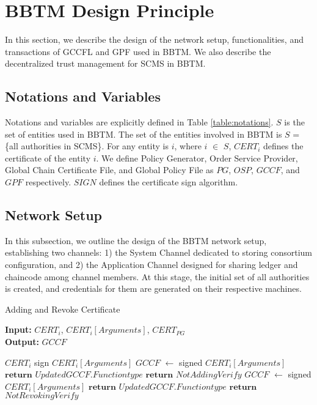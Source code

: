 \section{BBTM Design Principle }
\label{sec:bbtmdesign}
In this section, we describe the design of the network setup, functionalities, and transactions of GCCFL and GPF used in BBTM. We also describe the decentralized trust management for SCMS in BBTM.  

\subsection{Notations and Variables}
Notations and variables are explicitly defined in Table \ref{table:notations}. $S$ is the set of entities used in BBTM. The set of the entities involved in BBTM is $S$ =\{all authorities in SCMS\}. For any entity is $i$, where $i$ $\in$ $S$, $CERT_{i}$ defines the certificate of the entity $i$. We define Policy Generator, Order Service Provider, Global Chain Certificate File, and Global Policy File as $PG$, $OSP$, $GCCF$, and $GPF$ respectively. $SIGN$ defines the certificate sign algorithm.  




\subsection{Network Setup} 
In this subsection, we outline the design of the BBTM network setup, establishing two channels: 1) the System Channel dedicated to storing consortium configuration, and 2) the Application Channel designed for sharing ledger and chaincode among channel members. At this stage, the initial set of all authorities is created, and credentials for them are generated on their respective machines.  

\begin{algorithm}[t]
\caption{Adding and Revoke Certificate}\label{al:addcert}
\begin{flushleft}
\hspace*{\algorithmicindent} \textbf{Input:} $CERT_i$, $CERT_i[Arguments]$, $CERT_{PG}$ \\
\hspace*{\algorithmicindent} \textbf{Output:} $GCCF$  
\end{flushleft}
\begin{algorithmic}[1]
\State $CERT_i$ sign $CERT_i[Arguments]$
\State $GCCF$ $\gets$ signed $CERT_i[Arguments]$
\State $\textbf{return}$  $Updated GCCF.Function type$
\Else 
\State $\textbf{return}$ $Not Adding Verify$
\EndIf
{}
\State $GCCF$ $\gets$ signed $CERT_i[Arguments]$
\State $\textbf{return}$ $Updated GCCF.Function type$
\Else 
\State $\textbf{return}$ $Not Revoking Verify$
\EndIf
\end{algorithmic}
\end{algorithm} 

